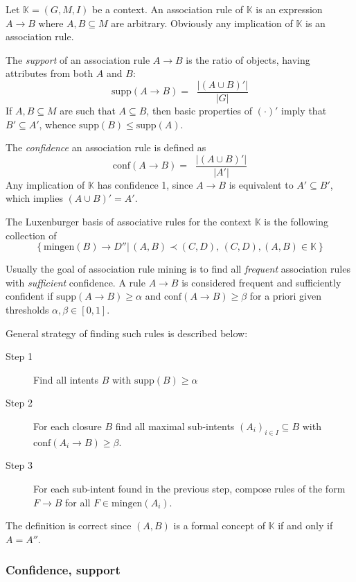 \documentclass[a4paper]{article}
\newcommand{\obj}[1]{{\left\{ #1 \right \}}}
\newcommand{\clo}[1]{{\left [ #1 \right ]}}
\newcommand{\brac}[1]{{\left ( #1 \right )}}
\newcommand{\induc}[1]{{\left . #1 \right \vert}}
\newcommand{\abs}[1]{{\left | #1 \right |}}
\newcommand{\Ctx}{\mathbb{K}}
\newcommand{\supp}{\text{supp}}
\newcommand{\conf}{\text{conf}}
\newcommand{\defn}{\mathop{\overset{\Delta}{=}}\nolimits}
\begin{document}
Let $\Ctx=\brac{G,M,I}$ be a context. An association rule of $\Ctx$ is an expression $A\to B$ where $A,B\subseteq M$ are arbitrary. Obviously any implication of $\Ctx$ is an association rule.

The \emph{support} of an association rule $A\to B$ is the ratio of objects, having attributes from both $A$ and $B$:\[\supp\brac{A\to B} = \defn \frac{\abs{\brac{A\cup B}'}}{\abs{G}}\] If $A,B\subseteq M$ are such that $A\subseteq B$, then basic properties of ${(\cdot)}'$ imply that $B'\subseteq A'$, whence $\supp(B)\leq \supp(A)$.

The \emph{confidence} an association rule is defined as \[\conf\brac{A\to B} = \defn \frac{\abs{\brac{A\cup B}'}}{\abs{A'}}\] Any implication of $\Ctx$ has confidence 1, since $A\to B$ is equivalent to $A'\subseteq B'$, which implies $\brac{A\cup B}' = A'$.

The Luxenburger basis of associative rules for the context $\Ctx$ is the following collection of \[\obj{\induc{ \text{mingen}(B)\to D'' }\,(A,B)\prec(C,D),\,(C,D),(A,B)\in \Ctx}\]

Usually the goal of association rule mining is to find all \emph{frequent} association rules with \emph{sufficient} confidence. A rule $A\to B$ is considered frequent and sufficiently confident if $\supp\brac{A\to B}\geq \alpha$ and $\conf\brac{A\to B}\geq \beta$ for a priori given thresholds $\alpha,\beta\in \clo{0,1}$.

General strategy of finding such rules is described below:
\begin{description}
	\item[Step 1] Find all intents $B$ with $\supp(B)\geq \alpha$
	\item[Step 2] For each closure $B$ find all maximal sub-intents $\brac{A_i}_{i\in I}\subseteq B$ with $\conf\brac{A_i\to B}\geq \beta$.
	\item[Step 3] For each sub-intent found in the previous step, compose rules of the form $F\to B$ for all $F\in \text{mingen}(A_i)$.
\end{description}

The definition is correct since $(A,B)$ is a formal concept of $\Ctx$ if and only if $A=A''$.


\subsubsection{Confidence, support} %
\label{ssub:confidence_support}
\end{document}
